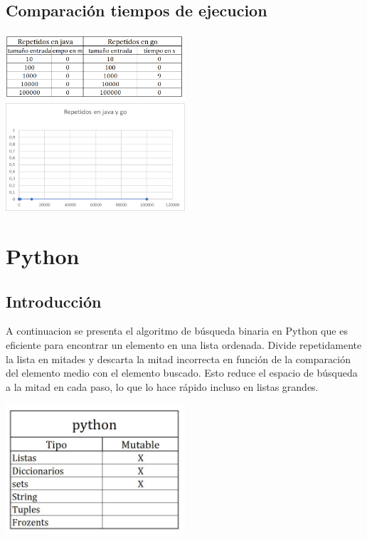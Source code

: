\documentclass{article}
\begin{document}
\subsection{Comparación tiempos de ejecucion}
\includegraphics[width=0.5\textwidth]{golangvsjavaTabla.png}
\includegraphics[width=0.5\textwidth]{golangvsjavaGrafica.png}



\section{Python}
\subsection{Introducción}
A continuacion se presenta el algoritmo de búsqueda binaria en Python que es  eficiente para encontrar un elemento en una lista ordenada. Divide repetidamente la lista en mitades y descarta la mitad incorrecta en función de la comparación del elemento medio con el elemento buscado. Esto reduce el espacio de búsqueda a la mitad en cada paso, lo que lo hace rápido incluso en listas grandes.

\includegraphics[width=0.5\textwidth]{pythonTabla.jpg}
\end{document}
